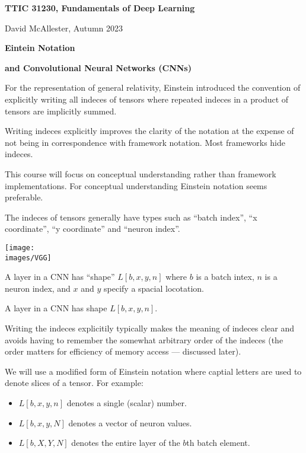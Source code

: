 




{\Huge

  \centerline{\bf TTIC 31230, Fundamentals of Deep Learning}
  \bigskip
  \centerline{David McAllester, Autumn 2023}

    \vfill
  \centerline{\bf Eintein Notation}
  \vfill
  \centerline{\bf and Convolutional Neural Networks (CNNs)}
  \vfill


For the representation of general relativity, Einstein introduced the convention of explicitly writing all indeces of tensors where repeated indeces in a product of tensors are implicitly summed.

\vfill
Writing indeces explicitly improves the clarity of the notation at the expense of not being in correspondence with framework notation.  Most frameworks hide indeces.

\vfill
This course will focus on conceptual understanding rather than framework implementations.  For conceptual understanding Einstein notation seems preferable.


The indeces of tensors generally have types such as ``batch index'', ``x coordinate'', ``y coordinate'' and  ``neuron index''.

\vfill
\centerline{\texttt{[image: \\images/VGG]}}

\vfill
A layer in a CNN has ``shape'' {\color{red} $L[b,x,y,n]$} where $b$ is a batch intex, $n$ is a neuron index, and $x$ and $y$ specify a spacial locotation.


A layer in a CNN has shape $L[b,x,y,n]$.

\vfill
Writing the indeces explicitily typically makes the meaning of indeces clear and avoids having to remember the somewhat arbitrary order of the indeces (the order matters for
efficiency of memory access --- discussed later).


\vfill
We will use a modified form of Einstein notation where captial letters are used to denote slices of a tensor.  For example:

\vfill
\begin{itemize}

\item $L[b,x,y,n]$ denotes a single (scalar) number.
\vfill
\item $L[b,x,y,N]$ denotes a vector of neuron values.
\vfill
\item $L[b,X,Y,N]$ denotes the entire layer of the $b$th batch element.
\end{itemize}

}
